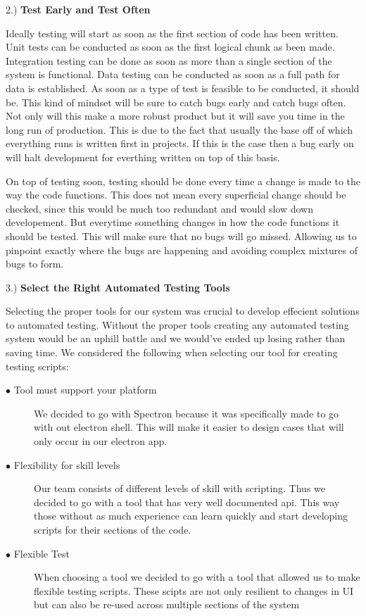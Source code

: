2.) \textbf{Test Early and Test Often}
\begin{adjustwidth}{3.5em}{0pt}
  Ideally testing will start as soon as the first section of code has been written. Unit tests can be conducted as soon as the first logical chunk as been made. Integration testing can be done as soon as more than a single section of the system is functional. Data testing can be conducted as soon as a full path for data is established. As soon as a type of test is feasible to be conducted, it should be. This kind of mindset will be sure to catch bugs early and catch bugs often. Not only will this make a more robust product but it will save you time in the long run of production. This is due to the fact that usually the base off of which everything runs is written first in projects. If this is the case then a bug early on will halt development for everthing written on top of this basis.
  \par On top of testing soon, testing should be done every time a change is made to the way the code functions. This does not mean every superficial change should be checked, since this would be much too redundant and would slow down developement. But everytime something changes in how the code functions it should be tested. This will make sure that no bugs will go missed. Allowing us to pinpoint exactly where the bugs are happening and avoiding complex mixtures of bugs to form.
\end{adjustwidth}

\vspace{10mm}

3.) \textbf{Select the Right Automated Testing Tools}
\begin{adjustwidth}{3.5em}{0pt}
  Selecting the proper tools for our system was crucial to develop effecient solutions to automated testing. Without the proper tools creating any automated testing system would be an uphill battle and we would've ended up losing rather than saving time. We considered the following when selecting our tool for creating testing scripts: \newline
    \begin{description}
      \item [$\bullet$ Tool must support your platform]
        We decided to go with Spectron because it was specifically made to go with out electron shell. This will make it easier to design cases that will only occur in our electron app.
      \item [$\bullet$ Flexibility for skill levels] Our team consists of different levels of skill with scripting. Thus we decided to go with a tool that has very well documented api. This way those without as much experience can learn quickly and start developing scripts for their sections of the code.
      \item [$\bullet$ Flexible Test] When choosing a tool we decided to go with a tool that allowed us to make flexible testing scripts. These scipts are not only resilient to changes in UI but can also be re-used across multiple sections of the system
    \end{description}
\end{adjustwidth}

